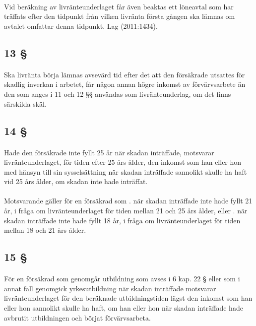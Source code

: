 \documentclass[a4paper,notitlepage,openany,10pt]{book}
\begin{document}
\paragraph*{}
Vid beräkning av livränteunderlaget får även beaktas ett löneavtal som har träffats efter den tidpunkt från vilken livränta första gången ska lämnas om avtalet omfattar denna tidpunkt.
Lag (2011:1434).
\subsection*{13 §}
\paragraph*{}
Ska livränta börja lämnas avsevärd tid efter det att den försäkrade utsattes för skadlig inverkan i arbetet, får någon annan högre inkomst av förvärvsarbete än den som anges i 11 och 12 §§ användas som livränteunderlag, om det finns särskilda skäl.
\subsection*{14 §}
\paragraph*{}
Hade den försäkrade inte fyllt 25 år när skadan inträffade, motsvarar livränteunderlaget, för tiden efter 25 års ålder, den inkomst som han eller hon med hänsyn till sin sysselsättning när skadan inträffade sannolikt skulle ha haft vid 25 års ålder, om skadan inte hade inträffat.
\paragraph*{}
Motsvarande gäller för en försäkrad som
. när skadan inträffade inte hade fyllt 21 år, i fråga om livränteunderlaget för tiden mellan 21 och 25 års ålder, eller
. när skadan inträffade inte hade fyllt 18 år, i fråga om livränteunderlaget för tiden mellan 18 och 21 års ålder.
\subsection*{15 §}
\paragraph*{}
För en försäkrad som genomgår utbildning som avses i 6 kap. 22 § eller som i annat fall genomgick yrkesutbildning när skadan inträffade motsvarar livränteunderlaget för den beräknade utbildningstiden lägst den inkomst som han eller hon sannolikt skulle ha haft, om han eller hon när skadan inträffade hade avbrutit utbildningen och börjat förvärvsarbeta.
\end{document}
